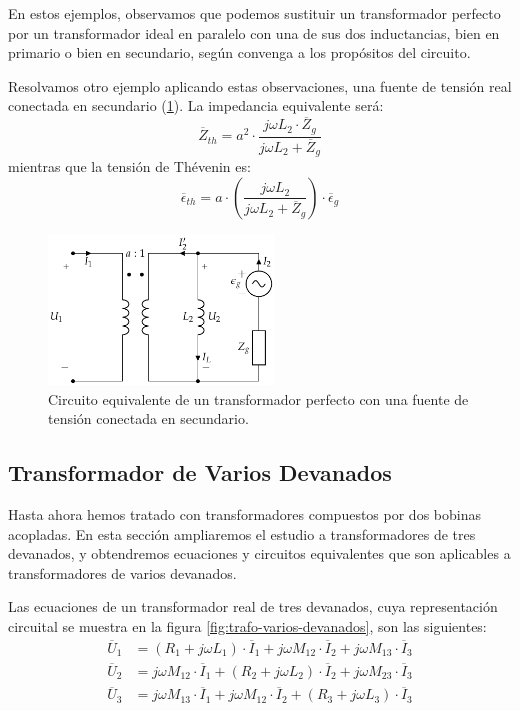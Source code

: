   En estos ejemplos, observamos que podemos sustituir un transformador perfecto por un transformador ideal en paralelo con una de sus dos inductancias, bien en primario o bien en secundario, según convenga a los propósitos del circuito.

  Resolvamos otro ejemplo aplicando estas observaciones, una fuente de tensión real conectada en secundario (\ref{fig:trafo-perfecto-ideal-V2}). La impedancia equivalente será:
  \[
    \overline{Z}_{th} = a^2 \cdot \frac{j \omega L_2 \cdot
    \overline{Z}_g}{j\omega L_2 + \overline{Z}_g}
  \]
mientras que la tensión de Thévenin es:
  \[
    \overline{\epsilon}_{th} = a \cdot \left(\frac{j\omega
      L_2}{j\omega L_2 + \overline{Z}_g}\right) \cdot
    \overline{\epsilon}_g
  \]

  \begin{figure}
    \centering
    \includegraphics[height=4cm]{../figs/TrafoPerfecto_Ideal_FuenteSec.pdf}
    \caption{Circuito equivalente de un transformador perfecto con una fuente de tensión conectada en secundario.}
    \label{fig:trafo-perfecto-ideal-V2}
  \end{figure}

  
\subsection{Transformador de Varios Devanados}
\label{sec:trafo-varios-devanados}

Hasta ahora hemos tratado con transformadores compuestos por dos bobinas acopladas. En esta sección ampliaremos el estudio a transformadores de tres devanados, y obtendremos ecuaciones y circuitos equivalentes que son aplicables a transformadores de varios devanados.

Las ecuaciones de un transformador real de tres devanados, cuya representación circuital se muestra en la figura \ref{fig:trafo-varios-devanados}, son las siguientes:
\begin{align*}
  \overline{U}_1 &= (R_1 + j \omega L_1) \cdot \overline{I}_1 + j \omega M_{12} \cdot\overline{I}_2 + j \omega M_{13} \cdot\overline{I}_3\\
  \overline{U}_2 &= j \omega M_{12} \cdot \overline{I}_1 + (R_2 + j \omega L_2) \cdot \overline{I}_2 + j \omega M_{23} \cdot \overline{I}_3\\
  \overline{U}_3 &= j \omega M_{13} \cdot \overline{I}_1 + j \omega M_{12} \cdot\overline{I}_2 + (R_3 + j \omega L_3) \cdot \overline{I}_3
\end{align*}

